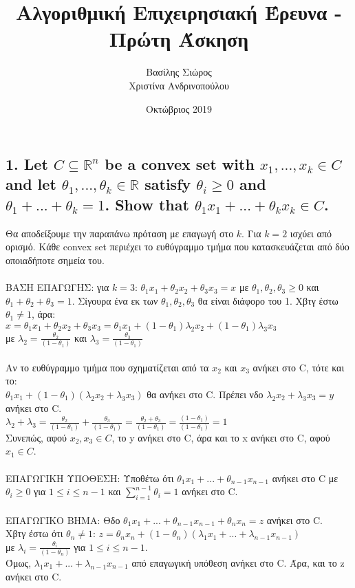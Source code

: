 \documentclass[12pt]{article}
\title{Αλγοριθμική Επιχειρησιακή Έρευνα - Πρώτη Άσκηση}
\author{Βασίλης Σιώρος \\ Χριστίνα Ανδρινοπούλου}
\date{Οκτώβριος 2019}
\begin{document}
\maketitle 

\vspace{0.1in}

\subsection*{1. Let $C \subseteq \mathbb{R}^n$ be a convex set with $x_1 ,..., x_k \in C$ and let $θ_1 , . . . , θ_k \in \mathbb{R}$ satisfy $θ_i \geq 0$ and
$θ_1 +...+ θ_k = 1$. Show that $θ_1x_1 +...+ θ_kx_k \in C$.}


Θα αποδείξουμε την παραπάνω πρόταση με επαγωγή στο $k$. Για $k = 2$ ισχύει από ορισμό. Κάθε convex set περιέχει το ευθύγραμμο τμήμα που κατασκευάζεται από δύο οποιαδήποτε σημεία του.
\\
\\
ΒΑΣΗ ΕΠΑΓΩΓΗΣ: για $k = 3$: $θ_1x_1 + θ_2x_2 + θ_3x_3 = x$ με $θ_1,θ_2,θ_3 \geq 0$ και $θ_1 + θ_2 + θ_3 = 1$. Σίγουρα ένα εκ των $θ_1,θ_2,θ_3$ θα είναι διάφορο του 1. Χβτγ έστω $θ_1 \neq 1$, άρα: \\
$x = θ_1x_1 +  θ_2x_2 + θ_3x_3 = θ_1x_1 + (1 - θ_1)λ_2x_2 + (1 - θ_1)λ_3x_3$ \\
με $λ_2 = \frac{θ_2}{(1 - θ_1)}$ και $λ_3 = \frac{θ_3}{(1 - θ_1)}$
\\
\\
Αν το ευθύγραμμο τμήμα που σχηματίζεται από τα $x_2$ και $x_3$ ανήκει στο C, τότε και το: \\
$θ_1x_1 + (1 - θ_1)(λ_2x_2 + λ_3x_3)$ θα ανήκει στο C. Πρέπει νδο $λ_2x_2 + λ_3x_3 = y$ ανήκει στο C. \\
$λ_2 +λ_3 = \frac{θ_2}{(1 - θ_1)} + \frac{θ_3}{(1 - θ_1)} = \frac{θ_2 + θ_3}{(1 - θ_1)} = \frac{(1 - θ_1)}{(1 - θ_1)} = 1$ \\
Συνεπώς, αφού $x_2,x_3 \in C$, το y ανήκει στο C, άρα και το x ανήκει στο C, αφού $x_1 \in C$.
\\
\\
ΕΠΑΓΩΓΙΚΗ ΥΠΟΘΕΣΗ: Υποθέτω ότι $θ_1x_1 + ... + θ_{n-1}x_{n-1}$ ανήκει στο C με $θ_i \geq 0$ για $1 \leq i \leq n-1$ και $ \sum_{i=1}^{n-1}θ_i = 1 $ ανήκει στο C.
\\
\\
ΕΠΑΓΩΓΙΚΟ ΒΗΜΑ: Θδο $θ_1x_1 + ... + θ_{n-1}x_{n-1} + θ_nx_n = z$ ανήκει στο C. \\
Χβτγ έστω ότι $θ_n \neq 1$:
$z = θ_nx_n + (1 - θ_n)(λ_1x_1 + ... + λ_{n-1}x_{n-1})$ \\
με $λ_i = \frac{θ_i}{(1 - θ_n)}$ για $1 \leq i \leq n-1$. \\
Όμως, $λ_1x_1 + ... + λ_{n-1}x_{n-1}$ από επαγωγική υπόθεση ανήκει στο C. Άρα, και το z ανήκει στο C.
\end{document}
